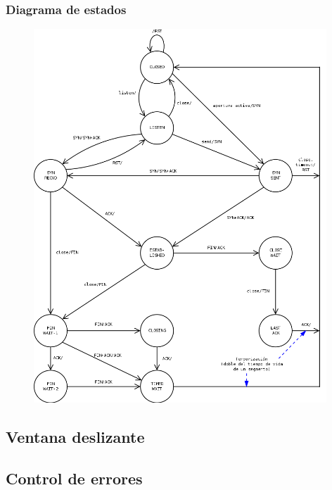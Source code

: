 \subsubsection{Diagrama de estados}
\begin{figure}[H]
    \centering
    \includegraphics[width=0.98\textwidth]{img/EstadosTCP.png}
\end{figure}
\newpage
\subsection{Ventana deslizante}
\subsection{Control de errores}
